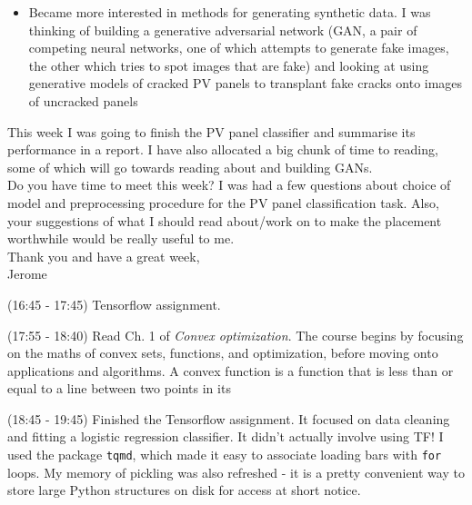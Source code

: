 \documentclass[idxtotoc,hyperref,openany]{labbook} %
\begin{document}
\begin{displayquote}
\begin{itemize}
\item Became more interested in methods for generating synthetic data. I was thinking of building a generative adversarial network (GAN, a pair of competing neural networks, one of which attempts to generate fake images, the other which tries to spot images that are fake) and looking at using generative models of cracked PV panels to transplant fake cracks onto images of uncracked panels
\end{itemize}
This week I was going to finish the PV panel classifier and summarise its performance in a report. I have also allocated a big chunk of time to reading, some of which will go towards reading about and building GANs.\\[0.7em]
Do you have time to meet this week? I was had a few questions about choice of model and preprocessing procedure for the PV panel classification task. Also, your suggestions of what I should read about/work on to make the placement worthwhile would be really useful to me.\\[0.7em]
Thank you and have a great week,\\[0.7em]
Jerome
\end{displayquote}
 
 (16:45 - 17:45) Tensorflow assignment.

 (17:55 - 18:40) Read Ch. 1 of \emph{Convex optimization}. The course begins by focusing on the maths of convex sets, functions, and optimization, before moving onto applications and algorithms. A convex function is a function that is less than or equal to a line between two points in its 
 
 (18:45 - 19:45) Finished the Tensorflow assignment. It focused on data cleaning and fitting a logistic regression classifier. It didn't actually involve using TF! I used the package \texttt{tqmd}, which made it easy to associate loading bars with \texttt{for} loops. My memory of pickling was also refreshed - it is a pretty convenient way to store large Python structures on disk for access at short notice.
 
\end{document}
